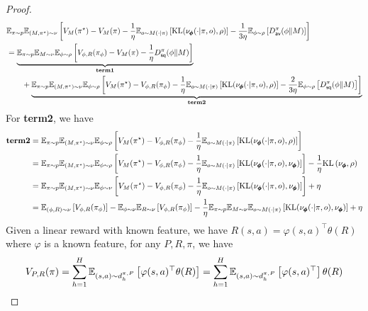 \begin{proof}
\begin{align*}
    &\mathbb{E}_{\pi\sim p}\mathbb{E}_{(M, \pi^\star) \sim \nu}\left[ V_M(\pi^\star) - V_M(\pi) - \frac{1}{\eta}\mathbb{E}_{o\sim M(\cdot|\pi)}\left[\text{KL}(\nu_{\pmb{\phi}}(\cdot|\pi, o), \rho)\right] - \frac{1}{3\eta} \mathbb{E}_{\phi\sim \rho}\left[D_{\mathsf{av}}^\pi(\phi\|M)\right]  \right]
    \\&= \underbrace{\mathbb{E}_{\pi\sim p}\mathbb{E}_{M \sim \nu}\mathbb{E}_{\phi \sim \rho}\left[  V_{\phi, R}(\pi_{\phi}) - V_M(\pi) - \frac{1}{\eta} D_{\mathsf{sq}}^\pi(\phi\|M)  \right]}_{\textbf{term1}}
    \\& \qquad  + \underbrace{\mathbb{E}_{\pi\sim p}\mathbb{E}_{(M, \pi^\star) \sim \nu}\mathbb{E}_{\phi \sim \rho}\left[ V_M(\pi^\star) - V_{\phi, R}(\pi_{\phi}) - \frac{1}{\eta}\mathbb{E}_{o\sim M(\cdot|\pi)}\left[\text{KL}(\nu_{\pmb{\phi}}(\cdot|\pi, o), \rho)\right] - \frac{2}{3\eta} \mathbb{E}_{\phi\sim \rho}\left[D_{\mathsf{sq}}^\pi(\phi\|M)\right]\right]}_{\textbf{term2}}
\end{align*}
For \textbf{term2}, we have
\begin{align*}
    \textbf{term2} &= \mathbb{E}_{\pi\sim p}\mathbb{E}_{(M, \pi^\star) \sim \nu}\mathbb{E}_{\phi \sim \rho}\left[ V_M(\pi^\star) - V_{\phi, R}(\pi_{\phi}) - \frac{1}{\eta}\mathbb{E}_{o\sim M(\cdot|\pi)}\left[\text{KL}(\nu_{\pmb{\phi}}(\cdot|\pi, o), \rho)\right] \right]
    \\&=  \mathbb{E}_{\pi\sim p}\mathbb{E}_{(M, \pi^\star) \sim \nu}\mathbb{E}_{\phi \sim \rho}\left[ V_M(\pi^\star) - V_{\phi, R}(\pi_{\phi}) - \frac{1}{\eta}\mathbb{E}_{o\sim M(\cdot|\pi)}\left[\text{KL}(\nu_{\pmb{\phi}}(\cdot|\pi, o), \nu_{\pmb{\phi}})\right] \right] - \frac{1}{\eta}\text{KL}\left(\nu_{\pmb{\phi}}, \rho\right)
    \\&= \mathbb{E}_{\pi\sim p}\mathbb{E}_{(M, \pi^\star) \sim \nu}\mathbb{E}_{\phi \sim \nu}\left[ V_M(\pi^\star) - V_{\phi, R}(\pi_{\phi}) - \frac{1}{\eta}\mathbb{E}_{o\sim M(\cdot|\pi)}\left[\text{KL}(\nu_{\pmb{\phi}}(\cdot|\pi, o), \nu_{\pmb{\phi}})\right] \right] + \eta
    \\&=\mathbb{E}_{(\phi ,R) \sim \nu}\left[ V_{\phi, R}(\pi_{\phi})\right] - \mathbb{E}_{\phi \sim \nu}\mathbb{E}_{R \sim \nu}\left[V_{\phi, R}(\pi_{\phi})\right] - \frac{1}{\eta}\mathbb{E}_{\pi \sim p}\mathbb{E}_{M \sim \nu}\mathbb{E}_{o\sim M(\cdot|\pi)}\left[\text{KL}(\nu_{\pmb{\phi}}(\cdot|\pi, o), \nu_{\pmb{\phi}})\right] + \eta
\end{align*}
Given a linear reward with known feature, we have $R(s,a) = \varphi(s,a)^\top \theta(R)$ where $\varphi$ is a known feature, for any $P, R, \pi$, we have
\begin{align*}
    V_{P, R}(\pi) = \sum_{h=1}^H \E_{(s,a) \sim d_{h}^{\pi, P}}\left[\varphi(s,a)^\top\theta(R)\right] = \sum_{h=1}^H \E_{(s,a) \sim d_{h}^{\pi, P}}\left[\varphi(s,a)^\top\right]\theta(R)

\end{align*}
\end{proof}
